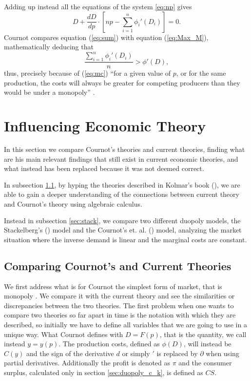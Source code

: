\documentclass[12pt]{article}
\numberwithin{equation}{subsection}
\let\oldsection\section%
\renewcommand{\section}{%
  \renewcommand{\theequation}{\thesection.\arabic{equation}}%
  \oldsection}%
\let\oldsubsection\subsection%
\renewcommand{\subsection}{%
  \renewcommand{\theequation}{\thesubsection.\arabic{equation}}%
  \oldsubsection}%
\begin{document}
Adding up instead all the equations of the system \ref{eq:np} gives \citep[p. 86]{cournot1897researches} \begin{equation}
\label{eq:sum}
D + \frac{dD}{dp} \cdot \left[np - \sum\limits_{i=1}^n \phi_i '(D_i) \right] = 0.
\end{equation} Cournot compares equation (\ref{eq:sum}) with equation (\ref{eq:Max_M}), mathematically deducing that \citep[p. 87]{cournot1897researches}\begin{equation}
\label{eq:mc}
\frac{\sum\limits_{i=1}^n \phi_i '(D_i)}{n} > \phi '(D),
\end{equation} thus, precisely because of (\ref{eq:mc}) ``for a given value of $p$, or for the same production, the costs will always be greater for competing producers than they would be under a monopoly'' \cite[p. 87]{cournot1897researches}.
\newpage
\section{Influencing Economic Theory}
\label{sec:infl}
In this section we compare Cournot's theories and current theories, finding what are his main relevant findings that still exist in current economic theories, and what instead has been replaced because it was not deemed correct. 

In subsection \ref{sec:alg}, by hyping the theories described in Kolmar's book (\citeyear{Kolmar_2022}), we are able to gain a deeper understanding of the connections between current theory and Cournot's theory using algebraic calculus. 

Instead in subsection \ref{sec:stack}, we compare two different duopoly models, the Stackelberg's (\citeyear{von_Stackelberg_2011}) model and the Cournot's et. al. (\citeyear{cournot1897researches}) model, analyzing the market situation where the inverse demand is linear and the marginal costs are constant.
\subsection{Comparing Cournot's and Current Theories}
\label{sec:alg}
We first address what is for Cournot the simplest form of market, that is monopoly \cite[p. 55]{cournot1897researches}. We compare it with the current theory and see the similarities or discrepancies between the two theories. The first problem when one wants to compare two theories so far apart in time is the notation with which they are described, so initially we have to define all variables that we are going to use in a unique way. What Cournot defines with $D = F(p)$, that is the quantity, we call instead $y = y(p)$. The production costs, defined as $\phi (D)$, will instead be $C(y)$ and the sign of the derivative $d$ or simply $'$ is replaced by $\partial$ when using partial derivatives. Additionally the profit is denoted as $\pi$ and the consumer surplus, calculated only in section \ref{sec:duopoly_c_k}, is defined as $CS$.
\end{document}
